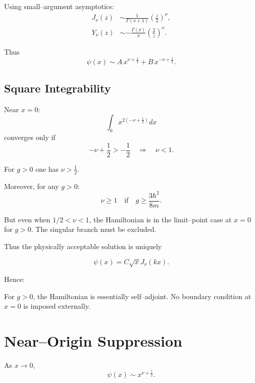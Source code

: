 \documentclass[11pt,a4paper]{article}
\begin{document}
Using small--argument asymptotics:
\begin{align}
J_\nu(z)&\sim \frac{1}{\Gamma(\nu+1)}\left(\frac{z}{2}\right)^\nu,\\
Y_\nu(z)&\sim -\frac{\Gamma(\nu)}{\pi}\left(\frac{2}{z}\right)^\nu.
\end{align}

Thus
\begin{equation}
\psi(x)
\sim
A\, x^{\nu+\frac{1}{2}}
+
B\, x^{-\nu+\frac{1}{2}}.
\end{equation}

\subsection*{Square Integrability}

Near $x=0$:
\begin{equation}
\int_0 x^{2(-\nu+\frac{1}{2})} dx
\end{equation}
converges only if
\begin{equation}
-\nu+\frac{1}{2} > -\frac{1}{2}
\quad\Longrightarrow\quad
\nu<1.
\end{equation}

For $g>0$ one has
\(
\nu>\frac{1}{2}.
\)

Moreover, for any $g>0$:
\begin{equation}
\nu \ge 1
\quad \text{if} \quad
g \ge \frac{3\hbar^2}{8m}.
\end{equation}

But even when $1/2<\nu<1$, the Hamiltonian is in the
limit–point case at $x=0$ for $g>0$.
The singular branch must be excluded.

Thus the physically acceptable solution is uniquely

\begin{equation}
\boxed{
\psi(x)=C\sqrt{x}J_\nu(kx).
}
\end{equation}

Hence:

\begin{center}
For $g>0$, the Hamiltonian is essentially self–adjoint.
No boundary condition at $x=0$ is imposed externally.
\end{center}

\section{Near–Origin Suppression}

As $x\to 0$,
\begin{equation}
\psi(x)\sim x^{\nu+\frac{1}{2}}.
\end{equation}
\end{document}
